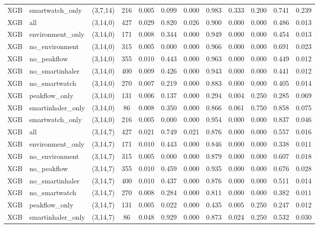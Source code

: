\begin{longtable}{llcccccccccc}
XGB & smartwatch\_only & (3,7,14) & 216 & 0.005 & 0.099 & 0.000 & 0.983 & 0.333 & 0.200 & 0.741 & 0.239 \\
XGB & all & (3,14,0) & 427 & 0.029 & 0.820 & 0.026 & 0.900 & 0.000 & 0.000 & 0.486 & 0.013 \\
XGB & environment\_only & (3,14,0) & 171 & 0.008 & 0.344 & 0.000 & 0.949 & 0.000 & 0.000 & 0.454 & 0.013 \\
XGB & no\_environment & (3,14,0) & 315 & 0.005 & 0.000 & 0.000 & 0.966 & 0.000 & 0.000 & 0.691 & 0.023 \\
XGB & no\_peakflow & (3,14,0) & 355 & 0.010 & 0.443 & 0.000 & 0.963 & 0.000 & 0.000 & 0.449 & 0.012 \\
XGB & no\_smartinhaler & (3,14,0) & 400 & 0.009 & 0.426 & 0.000 & 0.943 & 0.000 & 0.000 & 0.441 & 0.012 \\
XGB & no\_smartwatch & (3,14,0) & 270 & 0.007 & 0.219 & 0.000 & 0.883 & 0.000 & 0.000 & 0.405 & 0.014 \\
XGB & peakflow\_only & (3,14,0) & 131 & 0.006 & 0.137 & 0.000 & 0.294 & 0.004 & 0.250 & 0.285 & 0.069 \\
XGB & smartinhaler\_only & (3,14,0) & 86 & 0.008 & 0.350 & 0.000 & 0.866 & 0.061 & 0.750 & 0.858 & 0.075 \\
XGB & smartwatch\_only & (3,14,0) & 216 & 0.005 & 0.000 & 0.000 & 0.954 & 0.000 & 0.000 & 0.837 & 0.046 \\
XGB & all & (3,14,7) & 427 & 0.021 & 0.749 & 0.021 & 0.876 & 0.000 & 0.000 & 0.557 & 0.016 \\
XGB & environment\_only & (3,14,7) & 171 & 0.010 & 0.443 & 0.000 & 0.846 & 0.000 & 0.000 & 0.338 & 0.011 \\
XGB & no\_environment & (3,14,7) & 315 & 0.005 & 0.000 & 0.000 & 0.879 & 0.000 & 0.000 & 0.607 & 0.018 \\
XGB & no\_peakflow & (3,14,7) & 355 & 0.010 & 0.459 & 0.000 & 0.935 & 0.000 & 0.000 & 0.676 & 0.028 \\
XGB & no\_smartinhaler & (3,14,7) & 400 & 0.010 & 0.437 & 0.000 & 0.876 & 0.000 & 0.000 & 0.511 & 0.014 \\
XGB & no\_smartwatch & (3,14,7) & 270 & 0.008 & 0.284 & 0.000 & 0.811 & 0.000 & 0.000 & 0.382 & 0.011 \\
XGB & peakflow\_only & (3,14,7) & 131 & 0.005 & 0.022 & 0.000 & 0.435 & 0.005 & 0.250 & 0.247 & 0.012 \\
XGB & smartinhaler\_only & (3,14,7) & 86 & 0.048 & 0.929 & 0.000 & 0.873 & 0.024 & 0.250 & 0.532 & 0.030 \\

\end{longtable}
